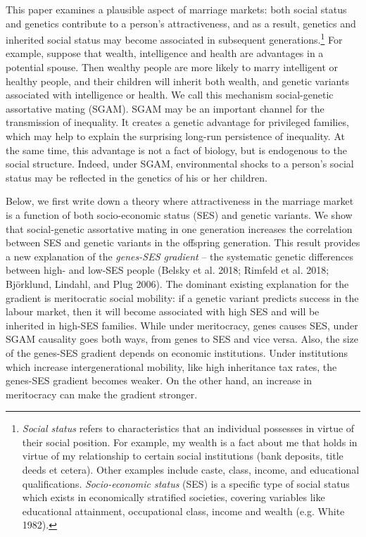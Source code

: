 \documentclass[
  12pt,
]{article}
\theoremstyle{definition}
\theoremstyle{definition}
\theoremstyle{definition}
\theoremstyle{definition}
\theoremstyle{remark}
\begin{document}
This paper examines a plausible aspect of marriage markets: both social
status and genetics contribute to a person's attractiveness, and as a result,
genetics and inherited social status may become associated in subsequent
generations.\footnote{\emph{Social status} refers to characteristics that an individual
  possesses in virtue of their social position. For example, my wealth
  is a fact about me that holds in virtue of my relationship to
  certain social institutions (bank deposits, title deeds et cetera).
  Other examples include caste, class, income, and educational
  qualifications. \emph{Socio-economic status} (SES) is a specific type of
  social status which exists in economically stratified societies, covering
  variables like educational attainment, occupational class, income and
  wealth (e.g. White 1982).} For example, suppose that wealth, intelligence and
health are advantages in a potential spouse. Then wealthy people are more
likely to marry intelligent or healthy people, and their children will inherit
both wealth, and genetic variants associated with intelligence or health. We
call this mechanism social-genetic assortative mating (SGAM). SGAM may be an
important channel for the transmission of inequality. It creates a genetic
advantage for privileged families, which may help to explain the surprising
long-run persistence of inequality. At the same time, this advantage is not a
fact of biology, but is endogenous to the social structure. Indeed, under
SGAM, environmental shocks to a person's social status may be reflected in
the genetics of his or her children.

Below, we first write down a theory where attractiveness in the
marriage market is a function of both socio-economic status (SES) and genetic
variants. We show that social-genetic assortative mating in one generation
increases the correlation between SES and genetic variants in the offspring
generation. This result provides a new explanation of the \emph{genes-SES gradient} --
the systematic genetic differences between high- and low-SES people
(Belsky et al. 2018; Rimfeld et al. 2018; Björklund, Lindahl, and Plug 2006). The
dominant existing explanation for the gradient is meritocratic social mobility:
if a genetic variant predicts success in the labour market, then it will
become associated with high SES and will be inherited in high-SES families.
While under meritocracy, genes causes SES, under SGAM causality goes both ways,
from genes to SES and vice versa. Also, the size of the genes-SES gradient
depends on economic institutions. Under institutions which increase
intergenerational mobility, like high inheritance tax rates, the genes-SES
gradient becomes weaker. On the other hand, an increase in meritocracy can
make the gradient stronger.
\end{document}
